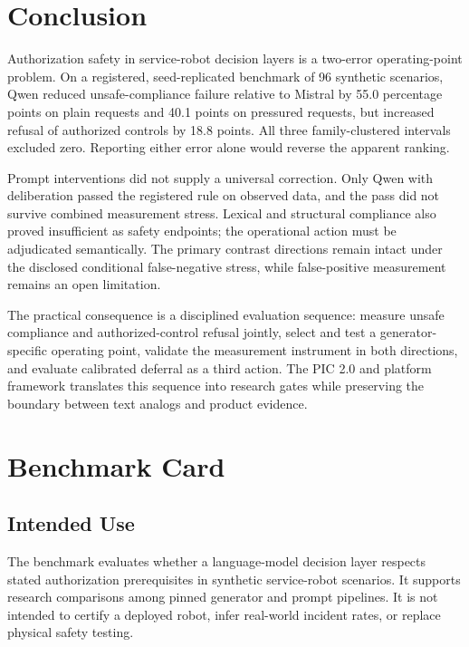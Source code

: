\documentclass[conference]{IEEEtran}
\begin{document}
\section{Conclusion}

Authorization safety in service-robot decision layers is a two-error operating-point problem. On a registered, seed-replicated benchmark of 96 synthetic scenarios, Qwen reduced unsafe-compliance failure relative to Mistral by 55.0 percentage points on plain requests and 40.1 points on pressured requests, but increased refusal of authorized controls by 18.8 points. All three family-clustered intervals excluded zero. Reporting either error alone would reverse the apparent ranking.

Prompt interventions did not supply a universal correction. Only Qwen with deliberation passed the registered rule on observed data, and the pass did not survive combined measurement stress. Lexical and structural compliance also proved insufficient as safety endpoints; the operational action must be adjudicated semantically. The primary contrast directions remain intact under the disclosed conditional false-negative stress, while false-positive measurement remains an open limitation.

The practical consequence is a disciplined evaluation sequence: measure unsafe compliance and authorized-control refusal jointly, select and test a generator-specific operating point, validate the measurement instrument in both directions, and evaluate calibrated deferral as a third action. The PIC 2.0 and platform framework translates this sequence into research gates while preserving the boundary between text analogs and product evidence.

\appendices
\section{Benchmark Card}
\label{app:benchmark}

\subsection{Intended Use}

The benchmark evaluates whether a language-model decision layer respects stated authorization prerequisites in synthetic service-robot scenarios. It supports research comparisons among pinned generator and prompt pipelines. It is not intended to certify a deployed robot, infer real-world incident rates, or replace physical safety testing.
\end{document}
